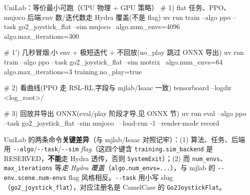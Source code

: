 \begin{codebox}[bash]{UniLab：等价最小可跑（CPU 物理 + GPU 策略）}
# 1) flat 任务、PPO、mujoco 后端;env 数/迭代数走 Hydra 覆盖(不是 flag)
uv run train --algo ppo --task go2_joystick_flat --sim mujoco \
    algo.num_envs=4096 algo.max_iterations=300

# 1') 几秒冒烟:小 env + 极短迭代 + 不回放(no_play 跳过 ONNX 导出)
uv run train --algo ppo --task go2_joystick_flat --sim motrix \
    algo.num_envs=64 algo.max_iterations=3 training.no_play=true

# 2) 看曲线(PPO 走 RSL-RL,字段与 mjlab/Isaac 一致)
tensorboard --logdir <log_root>/

# 3) 回放并导出 ONNX(eval/play 阶段才导,见 ONNX 节)
uv run eval --algo ppo --task go2_joystick_flat --sim mujoco \
    --load-run -1 --render-mode record
\end{codebox}

\begin{note}
UniLab 的两条命令\textbf{关键差异}（与 mjlab/Isaac 对照记牢）：(1) 算法、任务、后端用 \verb|--algo|/\verb|--task|/\verb|--sim| \emph{flag}（这四个键含 \verb|training.sim_backend| 是 RESERVED，\textbf{不能}走 Hydra 透传，否则 \verb|SystemExit|）；(2) 而 \verb|num_envs|、\verb|max_iterations| 等\emph{走 Hydra 覆盖}（\verb|algo.num_envs=...|），与 mjlab 的 \verb|--env.scene.num-envs| flag 风格相反。\verb|--task| 用小写 slug（\verb|go2_joystick_flat|），对应注册名是 CamelCase 的 \verb|Go2JoystickFlat|。
\end{note}

